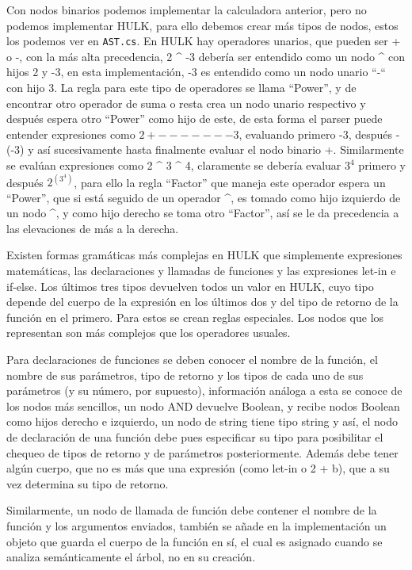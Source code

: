 \documentclass{article}
\begin{document}
Con nodos binarios podemos implementar la calculadora anterior, pero no podemos implementar HULK, para ello debemos crear más tipos de nodos, estos los podemos ver en \texttt{AST.cs}. En HULK hay operadores unarios, que pueden ser + o -, con la más alta precedencia,  2 \^{} -3  debería ser entendido como un nodo \^{} con hijos 2 y -3, en esta implementación, -3 es entendido como un nodo unario “-“ con hijo 3. La regla para este tipo de operadores se llama “Power”, y de encontrar otro operador de suma o resta crea un nodo unario respectivo y después espera otro “Power” como hijo de este, de esta forma el parser puede entender expresiones como $ 2 + -------3 $, evaluando primero -3, después -(-3) y así sucesivamente hasta finalmente evaluar el nodo binario +. Similarmente se evalúan expresiones como 2 \^{} 3 \^{} 4, claramente se debería evaluar $3 ^ 4$ primero y después $2 ^{ (3 ^ 4)} $, para ello la regla “Factor” que maneja este operador espera un “Power”, que si está seguido de un operador \^{}, es tomado como hijo izquierdo de un nodo \^{}, y como hijo derecho se toma otro “Factor”, así se le da precedencia a las elevaciones de más a la derecha.

Existen formas gramáticas más complejas en HULK que simplemente expresiones matemáticas, las declaraciones y llamadas de funciones y las expresiones let-in e if-else. Los últimos tres tipos devuelven todos un valor en HULK, cuyo tipo depende del cuerpo de la expresión en los últimos dos y del tipo de retorno de la función en el primero. Para estos se crean reglas especiales. Los nodos que los representan son más complejos que los operadores usuales. 

Para declaraciones de funciones se deben conocer el nombre de la función, el nombre de sus parámetros, tipo de retorno y los tipos de cada uno de sus parámetros (y su número, por supuesto), información análoga a esta se conoce de los nodos más sencillos, un nodo AND devuelve Boolean, y recibe nodos Boolean como hijos derecho e izquierdo, un nodo de string tiene tipo string y así, el nodo de declaración de una función debe pues especificar su tipo para posibilitar el chequeo de tipos de retorno y de parámetros posteriormente. Además debe tener algún cuerpo, que no es más que una expresión (como let-in o 2 + b), que a su vez determina su tipo de retorno. 

Similarmente, un nodo de llamada de función debe contener el nombre de la función y los argumentos enviados, también se añade en la implementación un objeto que guarda el cuerpo de la función en sí, el cual es asignado cuando se analiza semánticamente el árbol, no en su creación.
\end{document}
